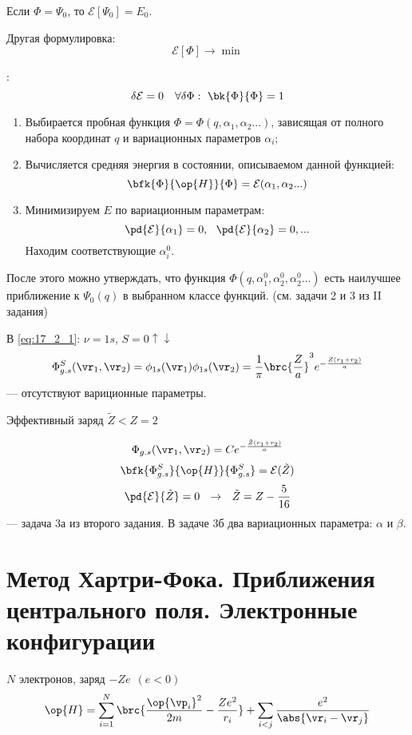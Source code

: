 Если $\Phi = \Psi_0$, то $\mathcal{E}[\Psi_0] = E_0$. 

Другая формулировка:
\begin{equation}
\label{eq:18_1_3}
\mathcal{E}[\Phi] \to \min
\end{equation}

:
\begin{equation}
\label{eq:18_1_4}
\delta \mathcal{E} = 0 ~~~ \forall \delta\Phi:~ \bk{\Phi}{\Phi} = 1
\end{equation}

\begin{enumerate}
\item Выбирается пробная функция $\Phi = \Phi(q, \alpha_1, \alpha_2 ... )$, зависящая от полного набора координат $q$ и вариационных параметров $\alpha_i$;
\item Вычисляется средняя энергия в состоянии, описываемом данной функцией:
$$
\bfk{\Phi}{\op{H}}{\Phi} = \mathcal{E}(\alpha_1, \alpha_2 ...)
$$
\item Минимизируем $E$ по вариационным параметрам:
$$
\pd{\mathcal{E}}{\alpha_1} = 0,~~ \pd{\mathcal{E}}{\alpha_2} = 0, ... 
$$
Находим соответствующие $\alpha_i^0$.
\end{enumerate}
После этого можно утверждать, что функция $\Phi(q, \alpha_1^0, \alpha_2^0, \alpha_2^0 ...)$ есть наилучшее приближение к $\Psi_0(q)$ в выбранном классе функций. (см. задачи 2 и 3 из II задания)

В \eqref{eq:17_2_1}: $\nu = 1s$, $S = 0 \uparrow \downarrow$
\begin{equation}
\label{eq:18_1_5}
\Phi_{g.s}^{S}(\vr_1, \vr_2) = \phi_{1s}(\vr_1)\phi_{1s}(\vr_2) = \frac{1}{\pi} \brc{\frac{Z}{a}}^3 e^{-\frac{Z(r_1 + r_2)}{a}}
\end{equation}
--- отсутствуют вариционные параметры.

Эффективный заряд $\tilde{Z} < Z = 2$

\begin{equation}
\label{eq:18_1_6}
\Phi_{g.s}(\vr_1, \vr_2) = C e^{-\frac{\tilde{Z}(r_1 + r_2)}{a}}
\end{equation}
$$
\bfk{\Phi_{g.s}^{S}}{\op{H}}{\Phi_{g.s}^{S}} = \mathcal{E}(\tilde{Z})
$$
$$
\pd{\mathcal{E}}{\tilde{Z}} = 0 ~~\to~~ \tilde{Z} = Z - \frac{5}{16}
$$
--- задача 3а из второго задания. В задаче 3б два вариационных параметра: $\alpha$ и $\beta$.

\section{Метод Хартри-Фока. Приближения центрального поля. Электронные конфигурации}
$N$ электронов, заряд $-Ze~~ (e<0)$
\begin{equation}
\label{eq:18_2_1}
\op{H} = \sum_{i=1}^{N} \brc{\frac{\op{\vp_i}^2}{2m} - \frac{Ze^2}{r_i}} + \sum_{i<j} \frac{e^2}{\abs{\vr_i - \vr_j}}
\end{equation}

